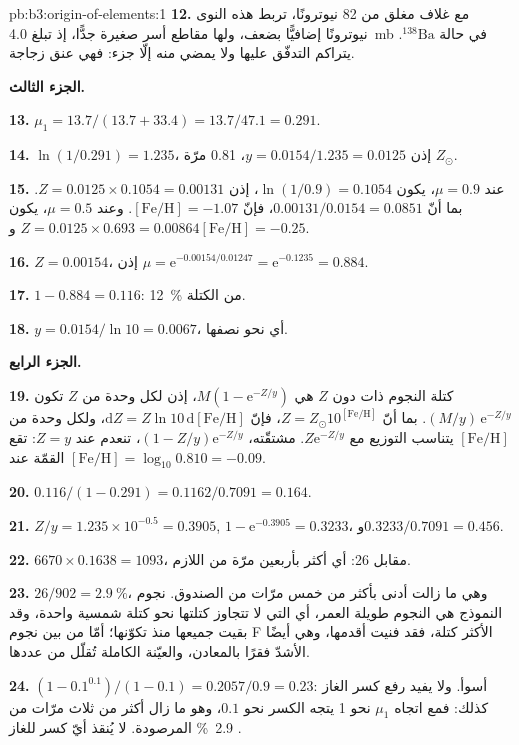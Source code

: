 \begin{solution}{pb:b3:origin-of-elements:1}
\textbf{12.} مع غلاف مغلق من 82 نيوترونًا، تربط هذه النوى نيوترونًا إضافيًّا
بضعف، ولها مقاطع أسر صغيرة جدًّا، إذ تبلغ \qty{4.0}{mb}
في حالة $^{138}\mathrm{Ba}$. يتراكم التدفّق عليها ولا يمضي منه إلّا جزء:
فهي عنق زجاجة.

\textbf{الجزء الثالث.}

\textbf{13.} $\mu_1 = 13.7/(13.7 + 33.4) = 13.7/47.1 = \num{0.291}$.

\textbf{14.} $\ln(1/0.291) = \num{1.235}$، إذن $y = 0.0154/1.235 = \num{0.0125}$،
\num{0.81} مرّة $Z_\odot$.

\textbf{15.} عند $\mu = 0.9$، يكون $\ln(1/0.9) = 0.1054$، إذن $Z = 0.0125\times0.1054 =
\num{0.00131}$. بما أنّ $0.00131/0.0154 = 0.0851$، فإنّ $[\mathrm{Fe/H}] =
-1.07$. وعند $\mu = 0.5$، يكون $Z = 0.0125\times0.693 = \num{0.00864}$
و$[\mathrm{Fe/H}] = -0.25$.

\textbf{16.} $Z = 0.00154$، إذن $\mu = \mathrm{e}^{-0.00154/0.01247} =
\mathrm{e}^{-0.1235} = \num{0.884}$.

\textbf{17.} $1 - 0.884 = \num{0.116}$: \qty{12}{\percent} من الكتلة.

\textbf{18.} $y = 0.0154/\ln 10 = \num{0.0067}$، أي نحو نصفها.

\textbf{الجزء الرابع.}

\textbf{19.} كتلة النجوم ذات  دون $Z$ هي
$M(1 - \mathrm{e}^{-Z/y})$، إذن لكل وحدة من $Z$ تكون
$(M/y)\,\mathrm{e}^{-Z/y}$. بما أنّ $Z = Z_\odot10^{[\mathrm{Fe/H}]}$،
فإنّ $\mathrm{d}Z = Z\ln 10\,\mathrm{d}[\mathrm{Fe/H}]$، ولكل وحدة
من $[\mathrm{Fe/H}]$ يتناسب التوزيع مع
$Z\mathrm{e}^{-Z/y}$. مشتقّته،
$(1 - Z/y)\mathrm{e}^{-Z/y}$، تنعدم عند $Z = y$: تقع القمّة عند
$[\mathrm{Fe/H}] = \log_{10}0.810 = -0.09$.

\textbf{20.} $\num{0.116}/(1 - 0.291) = 0.1162/0.7091 = \num{0.164}$.

\textbf{21.} $Z/y = 1.235\times10^{-0.5} = 0.3905$, $1 - \mathrm{e}^{-0.3905} =
0.3233$، و$0.3233/0.7091 = \num{0.456}$.

\textbf{22.} $6670\times0.1638 = 1093$، مقابل 26: أي أكثر بأربعين مرّة من اللازم.

\textbf{23.} $26/902 = \qty{2.9}{\percent}$، وهي ما زالت أدنى بأكثر من خمس مرّات
من الصندوق. نجوم النموذج هي النجوم طويلة العمر، أي التي لا تتجاوز كتلتها
نحو كتلة شمسية واحدة، وقد بقيت جميعها منذ تكوّنها؛ أمّا من بين
نجوم F الأكثر كتلة، فقد فنيت أقدمها، وهي أيضًا
الأشدّ فقرًا بالمعادن، والعيّنة الكاملة تُقلّل من عددها.

\textbf{24.} $(1 - 0.1^{0.1})/(1 - 0.1) = 0.2057/0.9 = \num{0.23}$: أسوأ.
ولا يفيد رفع كسر الغاز كذلك: فمع اتجاه $\mu_1$ نحو 1
يتجه الكسر نحو $0.1$، وهو ما زال أكثر من ثلاث مرّات
من \qty{2.9}{\percent} المرصودة. لا يُنقذ أيّ كسر للغاز .


\end{solution}

